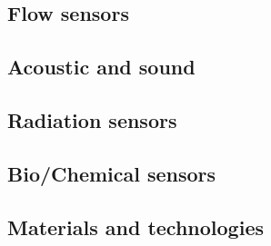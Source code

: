 \subsection{Flow sensors}

\subsection{Acoustic and sound}

\subsection{Radiation sensors}

\subsection{Bio/Chemical sensors}

\subsection{Materials and technologies}
